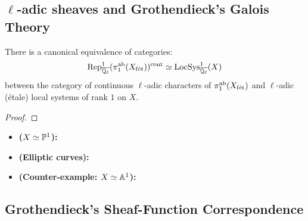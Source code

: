     \subsection{\texorpdfstring{$\ell$}{}-adic sheaves and Grothendieck's Galois Theory}
        \begin{theorem} \label{theorem: unramified_representations_are_sheaves_on_X}
            There is a canonical equivalence of categories:
                $$\Rep^1_{\overline{\Q_{\ell}}}(\pi_1^{\ab}(X_{\fet}))^{\cont} \cong \LocSys^1_{\overline{\Q_{\ell}}}(X)$$
            between the category of continuous $\ell$-adic characters of $\pi_1^{\ab}(X_{\fet})$ and $\ell$-adic (\'etale) local systems of rank $1$ on $X$.
        \end{theorem}
            \begin{proof}
                
            \end{proof}
        \begin{example}
            \noindent
            \begin{itemize}
                \item \textbf{($X \cong \P^1$):}
                \item \textbf{(Elliptic curves):}
                \item \textbf{(Counter-example: $X \cong \A^1$):}
            \end{itemize}
        \end{example}
        
    \subsection{Grothendieck's Sheaf-Function Correspondence}